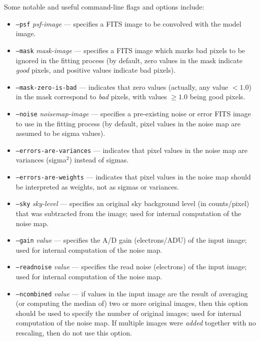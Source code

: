 \documentclass[10pt]{article}
\begin{document}
Some notable and useful command-line flags and options include:
\begin{itemize}
\item \texttt{--psf} \textit{psf-image} --- specifies a FITS image to be convolved
with the model image.

\bigskip

\item \texttt{--mask} \textit{mask-image} --- specifies a FITS image which marks
bad pixels to be ignored in the fitting process (by default, zero values in
the mask indicate \textit{good} pixels, and positive values indicate bad pixels).
\item \texttt{--mask-zero-is-bad} --- indicates that zero values (actually,
any value $< 1.0$) in the mask correspond to \textit{bad} pixels, with values
$\geq 1.0$ being good pixels.

\bigskip

\item \texttt{--noise} \textit{noisemap-image} --- specifies a pre-existing noise
or error FITS image to use in the fitting process (by default, pixel values in the
noise map are assumed to be sigma values).
\item \texttt{--errors-are-variances} --- indicates that pixel values in the noise
map are variances (sigma$^2$) instead of sigmas.
\item \texttt{--errors-are-weights} --- indicates that pixel values in the noise
map should be interpreted as weights, not as sigmas or variances.

\bigskip

\item \texttt{--sky} \textit{sky-level} --- specifies an original sky background
level (in counts/pixel) that was subtracted from the image; used for internal
computation of the noise map.
\item \texttt{--gain} \textit{value} --- specifies the A/D gain (electrons/ADU)
of the input image; used for internal computation of the noise map.
\item \texttt{--readnoise} \textit{value} --- specifies the read noise (electrons)
of the input image; used for internal computation of the noise map.
\item \texttt{--ncombined} \textit{value} --- if values in the input image are the
result of averaging (or computing the median of) two or more original images, then
this option should be used to specify the number of original images; used for internal 
computation of the noise map.  If multiple images were \textit{added} together
with no rescaling, then do not use this option.


\end{itemize}
\end{document}
